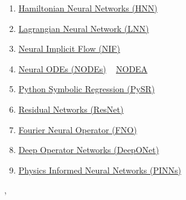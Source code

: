 \documentclass[11pt]{article}
\renewcommand{\today}{\shortmonthname[\the\month] \the \day,  \the\year}
\begin{document}
\begin{enumerate}
	\item  \href{https://mp.weixin.qq.com/s/rPDTlcpQhwVKn24GBj-lPw}{Hamiltonian Neural Networks (HNN)} %
	\item  \href{https://mp.weixin.qq.com/s/Qm_KB7Dt-LFNABctATuOlg}{Lagrangian Neural Network (LNN)} %
	\item  \href{https://mp.weixin.qq.com/s/zIFQfJ2YXiGAYp26u7TVXw}{Neural Implicit Flow (NIF)} %
	\item  \href{https://mp.weixin.qq.com/s/DJ9W3NngqNN69zFavPR7jQ}{Neural ODEs (NODEs)} ~ \href{https://mp.weixin.qq.com/s/JF-0pj0vJECqX1iSqpCryQ}{NODEA} %
	\item  \href{https://mp.weixin.qq.com/s/48IrFK3okhCm1VEPHHN-gg}{Python Symbolic Regression (PySR)} %
	\item  \href{https://mp.weixin.qq.com/s/csjZ0DS-f3IO93-lQzjzbw}{Residual Networks (ResNet)} %
	\item  \href{https://mp.weixin.qq.com/s/uXlx5kTpXeQd14Zer_Gr4g}{Fourier Neural Operator (FNO)} %
	\item  \href{https://mp.weixin.qq.com/s/FKecs-6h9zoum5WfU97W0gL}{Deep Operator Networks (DeepONet)} %
	\item  \href{https://mp.weixin.qq.com/s/p0ryb-hG9WWqer0oZCjY5A}{Physics Informed Neural Networks (PINNs)} %
\end{enumerate}




%
\begin{flushright}
	\tiny \today 
\end{flushright}
\end{document}
